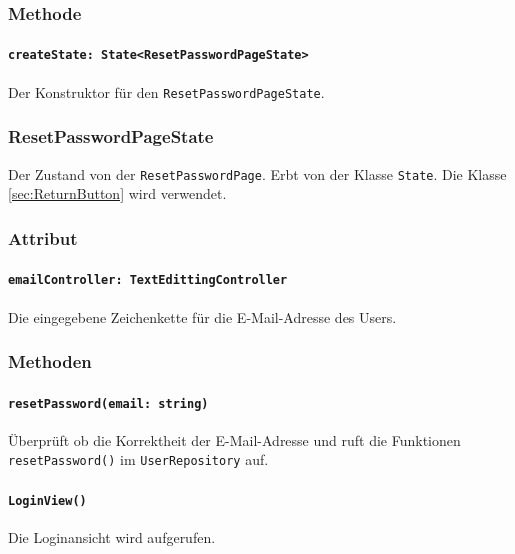 \documentclass{entwurfsheft}
\begin{document}
        \subsubsection*{Methode}
            \paragraph*{\texttt{createState: State<ResetPasswordPageState>}} Der Konstruktor für den \texttt{ResetPasswordPageState}.
    
    \subsubsection{ResetPasswordPageState}
        Der Zustand von der \texttt{ResetPasswordPage}. Erbt von der Klasse \texttt{State}. Die Klasse \ref{sec:ReturnButton} wird verwendet.
        \subsubsection*{Attribut}
            \paragraph*{\texttt{emailController: TextEdittingController}} Die eingegebene Zeichenkette für die E-Mail-Adresse des Users.
    
        \subsubsection*{Methoden}
            \paragraph*{\texttt{resetPassword(email: string)}} Überprüft ob die Korrektheit der E-Mail-Adresse und ruft die Funktionen \texttt{resetPassword()} im \texttt{UserRepository} auf.
            \paragraph*{\texttt{LoginView()}} Die Loginansicht wird aufgerufen.
    
\end{document}
